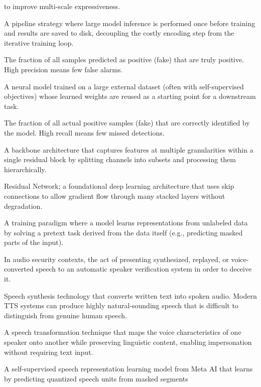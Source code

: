 \documentclass[11pt,a4paper]{article}
\begin{document}
\begin{description}[style=nextline, leftmargin=3.5cm, labelwidth=3.3cm,
                    font=\normalfont\bfseries]
    to improve multi-scale expressiveness.
  \item[Offline Feature Extraction] A pipeline strategy where large model inference
    is performed once before training and results are saved to disk, decoupling the
    costly encoding step from the iterative training loop.
  \item[Precision] The fraction of all samples predicted as positive (fake) that
    are truly positive. High precision means few false alarms.
  \item[Pre-trained Model] A neural model trained on a large external dataset
    (often with self-supervised objectives) whose learned weights are reused as a
    starting point for a downstream task.
  \item[Recall] The fraction of all actual positive samples (fake) that are
    correctly identified by the model. High recall means few missed detections.
  \item[Res2Net] A backbone architecture that captures features at multiple
    granularities within a single residual block by splitting channels into subsets
    and processing them hierarchically.
  \item[ResNet] Residual Network; a foundational deep learning architecture that
    uses skip connections to allow gradient flow through many stacked layers without
    degradation.
  \item[Self-Supervised Learning] A training paradigm where a model learns
    representations from unlabeled data by solving a pretext task derived from the
    data itself (e.g., predicting masked parts of the input).
  \item[Spoof / Spoofing] In audio security contexts, the act of presenting
    synthesized, replayed, or voice-converted speech to an automatic speaker
    verification system in order to deceive it.
  \item[TTS (Text-to-Speech)] Speech synthesis technology that converts written
    text into spoken audio. Modern TTS systems can produce highly natural-sounding
    speech that is difficult to distinguish from genuine human speech.
  \item[VC (Voice Conversion)] A speech transformation technique that maps the
    voice characteristics of one speaker onto another while preserving linguistic
    content, enabling impersonation without requiring text input.
  \item[wav2vec~2.0] A self-supervised speech representation learning model from
    Meta AI that learns by predicting quantized speech units from masked segments

\end{description}
\end{document}
